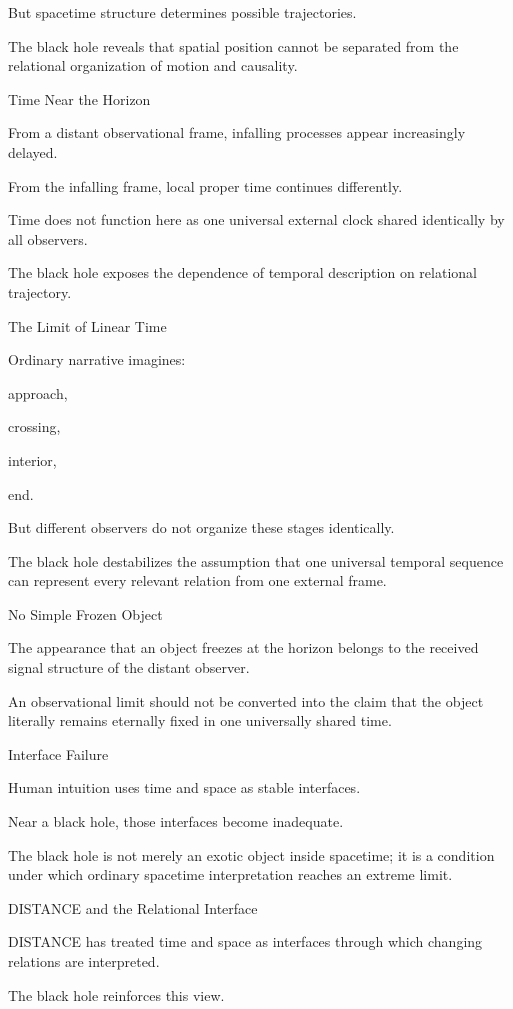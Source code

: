 But spacetime structure determines possible trajectories.

The black hole reveals that spatial position cannot be separated from the relational organization of motion and causality.

Time Near the Horizon

From a distant observational frame, infalling processes appear increasingly delayed.

From the infalling frame, local proper time continues differently.

Time does not function here as one universal external clock shared identically by all observers.

The black hole exposes the dependence of temporal description on relational trajectory.

The Limit of Linear Time

Ordinary narrative imagines:

approach,

crossing,

interior,

end.

But different observers do not organize these stages identically.

The black hole destabilizes the assumption that one universal temporal sequence can represent every relevant relation from one external frame.

No Simple Frozen Object

The appearance that an object freezes at the horizon belongs to the received signal structure of the distant observer.

An observational limit should not be converted into the claim that the object literally remains eternally fixed in one universally shared time.

Interface Failure

Human intuition uses time and space as stable interfaces.

Near a black hole, those interfaces become inadequate.

The black hole is not merely an exotic object inside spacetime; it is a condition under which ordinary spacetime interpretation reaches an extreme limit.

DISTANCE and the Relational Interface

DISTANCE has treated time and space as interfaces through which changing relations are interpreted.

The black hole reinforces this view.

